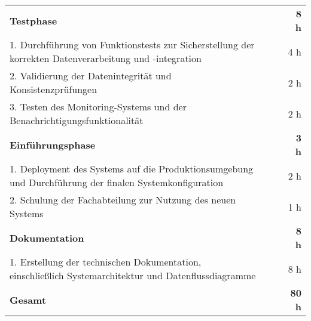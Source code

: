 \begin{tabularx}{\textwidth}{Xrrr}
\rowcolor{heading}\textbf{Testphase} & \textbf{} & \textbf{} & \textbf{8 h} \\
1. Durchführung von Funktionstests zur Sicherstellung der korrekten Datenverarbeitung und -integration &       &    & 4 h \\
\rowcolor{odd}2. Validierung der Datenintegrität und Konsistenzprüfungen &       &    & 2 h \\
3. Testen des Monitoring-Systems und der Benachrichtigungsfunktionalität &       &    & 2 h \\
\rowcolor{heading}\textbf{Einführungsphase} & \textbf{} & \textbf{} & \textbf{3 h} \\
1. Deployment des Systems auf die Produktionsumgebung und Durchführung der finalen Systemkonfiguration &       &    & 2 h \\
\rowcolor{odd}2. Schulung der Fachabteilung zur Nutzung des neuen Systems &       &    & 1 h \\
\rowcolor{heading}\textbf{Dokumentation} & \textbf{} & \textbf{} & \textbf{8 h} \\
1. Erstellung der technischen Dokumentation, einschließlich Systemarchitektur und Datenflussdiagramme &       &    & 8 h \\
\hline
\hline
\rowcolor{heading}\textbf{Gesamt} & \textbf{} & \textbf{} & \textbf{80 h} \\
\end{tabularx}
